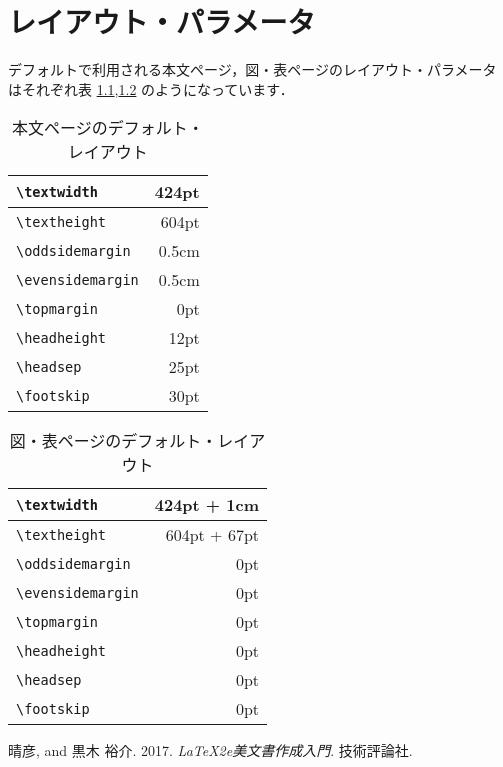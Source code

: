 \documentclass[
  sotsuron]{kuee}
\begin{document}
\chapter{レイアウト・パラメータ}\label{chap:layout}

デフォルトで利用される本文ページ，図・表ページのレイアウト・パラメータ
はそれぞれ表 \ref{tab:text},\ref{tab:fig} のようになっています．

\begin{table}
  \caption{本文ページのデフォルト・レイアウト}\label{tab:text}
  \begin{center}
    \begin{tabular}{|l|r|}
      \hline
      \verb+\textwidth+ & 424pt \\ \hline
      \verb+\textheight+ & 604pt \\ \hline
      \verb+\oddsidemargin+ & 0.5cm \\ \hline
      \verb+\evensidemargin+ & 0.5cm \\ \hline
      \verb+\topmargin+ & 0pt   \\ \hline
      \verb+\headheight+ & 12pt  \\ \hline
      \verb+\headsep+ & 25pt  \\ \hline
      \verb+\footskip+ & 30pt  \\ \hline
    \end{tabular}
  \end{center}
\end{table}

\begin{table}
  \caption{図・表ページのデフォルト・レイアウト}\label{tab:fig}
  \begin{center}
    \begin{tabular}{|l|r|}
      \hline
      \verb+\textwidth+ & 424pt + 1cm  \\ \hline
      \verb+\textheight+ & 604pt + 67pt \\ \hline
      \verb+\oddsidemargin+ & 0pt          \\ \hline
      \verb+\evensidemargin+ & 0pt          \\ \hline
      \verb+\topmargin+ & 0pt          \\ \hline
      \verb+\headheight+ & 0pt          \\ \hline
      \verb+\headsep+ & 0pt          \\ \hline
      \verb+\footskip+ & 0pt          \\ \hline
    \end{tabular}
  \end{center}
\end{table}

\hypertarget{refs}{}
\leavevmode\hypertarget{ref-GuideBook}{}%
晴彦, and 黒木 裕介. 2017. \emph{LaTeX2e美文書作成入門}. 技術評論社.
\end{document}
